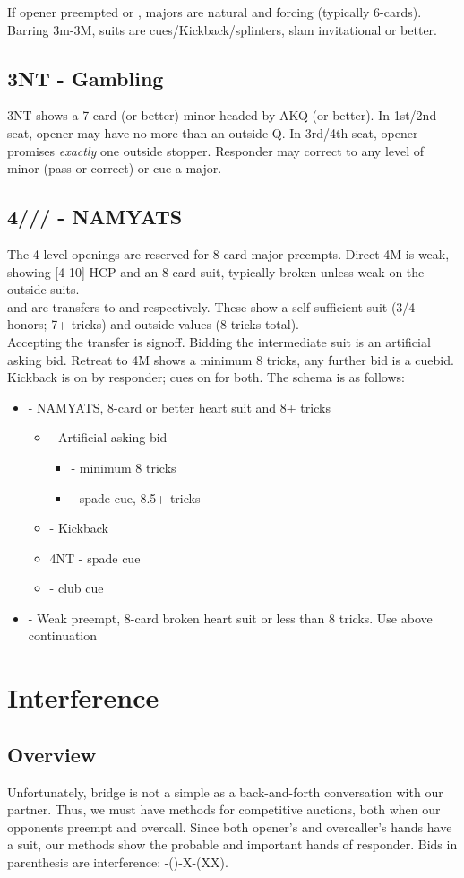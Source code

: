 \documentclass[12pt]{report}
\newcommand{\n}{\\}
\newcommand{\ul}[1]{\begin{itemize}#1\end{itemize}}
\newcommand{\li}{\item[~]}
\newcommand{\bidsection}[2]{\section{\texorpdfstring{#1}{#2}}}
\begin{document}
    If opener preempted  or , majors are natural and forcing (typically 6-cards).  Barring 3m-3M, suits are cues/Kickback/splinters, slam invitational or better.

\bidsection{3NT - Gambling}{3NT - Gambling} \label{2:11}

    3NT shows a 7-card (or better) minor headed by AKQ (or better).  In 1st/2nd seat, opener may have no more than an outside Q.  In 3rd/4th seat, opener promises \textit{exactly} one outside stopper. Responder may correct to any level of minor (pass or correct) or cue a major.

\bidsection{4\cl{}/\di{}/\he{}/\sp{} - NAMYATS}{4♣/♢/♡/♠ - NAMYATS} \label{2:12}

    The 4-level openings are reserved for 8-card major preempts.  Direct 4M is weak, showing [4-10] HCP and an 8-card suit, typically broken unless weak on the outside suits.\n

     and  are transfers to  and  respectively.  These show a self-sufficient suit (3/4 honors; 7+ tricks) and outside values (8 tricks total).\n

    Accepting the transfer is signoff.  Bidding the intermediate suit is an artificial asking bid.  Retreat to 4M shows a minimum 8 tricks, any further bid is a cuebid.\n

    Kickback is on by responder; cues on for both.  The schema is as follows:

    \ul {
        \li {} - NAMYATS, 8-card or better heart suit and 8+ tricks
        \ul {
            \li \di4 - Artificial asking bid
            \ul {
                \li \he4 - minimum 8 tricks
                \li \sp4 - spade cue, 8.5+ tricks
            }
            \li \sp4 - Kickback
            \li 4NT - spade cue
            \li \cl5 - club cue
        }
        \li \he4 - Weak preempt, 8-card broken heart suit or less than 8 tricks.  Use above continuation
    }

\chapter{Interference}
\section{Overview} \label{3:1}

Unfortunately, bridge is not a simple as a back-and-forth conversation with our partner.  Thus, we must have methods for competitive auctions, both when our opponents preempt and overcall.  Since both opener's and overcaller's hands have a suit, our methods show the probable and important hands of responder.  Bids in parenthesis are interference: -()-X-(XX). \n
\end{document}
